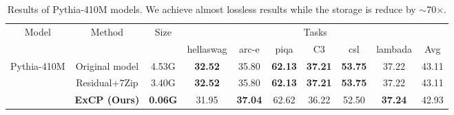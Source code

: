 \documentclass{article}
\theoremstyle{plain}
\theoremstyle{definition}
\theoremstyle{remark}
\begin{document}
\begin{CJK}{UTF8}{gbsn}
\begin{table}[th]
	\vspace{-8pt}
	\caption{Results of Pythia-410M models. We achieve almost lossless results while the storage is reduce by $\sim$70$\times$.}
	\centering
	\begin{tabular}{c|c|c|ccccccc}
		\toprule
		\multirow{2}{*}{Model}       & \multirow{2}{*}{Method} & \multirow{2}{*}{Size} & \multicolumn{7}{c}{Tasks}                                   \\ \cmidrule(lr){4-10} 
		&                         &                       & hellaswag & arc-e &  piqa & C3 & csl & lambada & Avg \\ \midrule
		\multirow{3}{*}{Pythia-410M} & Original model          &         4.53G              &     \textbf{32.52}    &  35.80     &    \textbf{62.13}    &  \textbf{37.21}  &  \textbf{53.75}   &    37.22     &   43.11  \\
		& Residual+7Zip            &        3.40G           &    \textbf{32.52}    &  35.80     &   \textbf{62.13}    &  \textbf{37.21}  &  \textbf{53.75}   &    37.22    &  43.11  \\	
		& \textbf{ExCP (Ours)}                 &     \textbf{0.06G}                  &    31.95     &   \textbf{37.04}   & 62.62 &   36.22 & 52.50 & \textbf{37.24} &  42.93 \\ %
		\bottomrule
	\end{tabular}
	\label{table:res}
	\vspace{-3mm}
\end{table}

\begin{table}[t]
	

\end{table}
\end{CJK}
\end{document}
